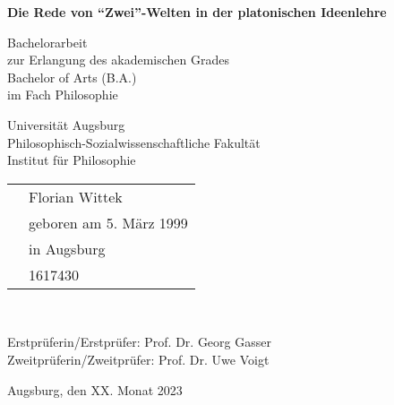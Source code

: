 \begin{titlepage}
	\begin{center}
		\vspace*{1cm}
		
		\textbf{\LARGE Die Rede von \enquote{Zwei}-Welten in der platonischen Ideenlehre}
		
		\vspace{0.5cm}
		\large
		
		Bachelorarbeit\\
		zur Erlangung des akademischen Grades\\
		Bachelor of Arts (B.A.)\\
		im Fach Philosophie\\
		\vspace {1.5cm}
	\end{center}
	\vspace{2.5cm}
	\raggedright
		Universität Augsburg\\
		Philosophisch-Sozialwissenschaftliche Fakultät\\
		Institut für Philosophie\\
		
		\vspace{1.5cm}
		
		\begin{tabular}{@{}ll}
			\makebox[2.5cm][l]{eingereicht von:} & \hspace{2cm} Florian Wittek\\
			& \hspace{2cm} geboren am 5. März 1999\\
			& \hspace{2cm} in Augsburg\\
			& \hspace{2cm} 1617430\\
		\end{tabular}\\	
		\vspace{1.5cm}

		Erstprüferin/Erstprüfer: \hspace{2cm} Prof. Dr. Georg Gasser\\
		Zweitprüferin/Zweitprüfer: \hspace{1.4cm} Prof. Dr. Uwe Voigt

		\vfill
		Augsburg, den \hspace{2.4cm} XX. Monat 2023
		
	
\end{titlepage}